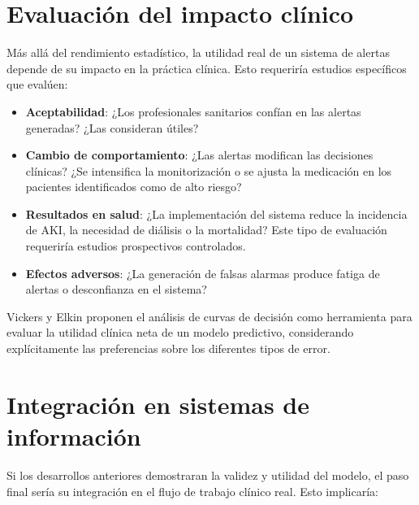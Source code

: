 \documentclass[12pt, a4paper, oneside]{report}
\begin{document}
\section{Evaluación del impacto clínico}

Más allá del rendimiento estadístico, la utilidad real de un sistema de alertas depende de su impacto en la práctica clínica. Esto requeriría estudios específicos que evalúen:

\begin{itemize}
    \item \textbf{Aceptabilidad}: ¿Los profesionales sanitarios confían en las alertas generadas? ¿Las consideran útiles?
    
    \item \textbf{Cambio de comportamiento}: ¿Las alertas modifican las decisiones clínicas? ¿Se intensifica la monitorización o se ajusta la medicación en los pacientes identificados como de alto riesgo?
    
    \item \textbf{Resultados en salud}: ¿La implementación del sistema reduce la incidencia de AKI, la necesidad de diálisis o la mortalidad? Este tipo de evaluación requeriría estudios prospectivos controlados.
    
    \item \textbf{Efectos adversos}: ¿La generación de falsas alarmas produce fatiga de alertas o desconfianza en el sistema?
\end{itemize}

Vickers y Elkin \cite{vickers2006decision} proponen el análisis de curvas de decisión como herramienta para evaluar la utilidad clínica neta de un modelo predictivo, considerando explícitamente las preferencias sobre los diferentes tipos de error.

\section{Integración en sistemas de información}

Si los desarrollos anteriores demostraran la validez y utilidad del modelo, el paso final sería su integración en el flujo de trabajo clínico real. Esto implicaría:
\end{document}
